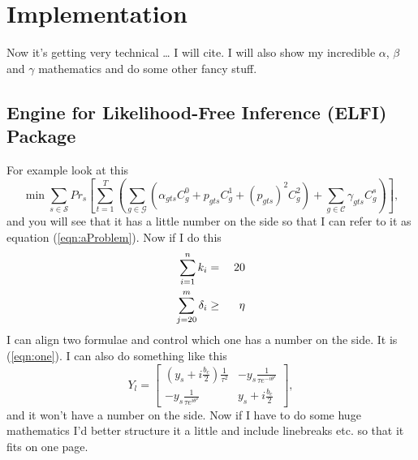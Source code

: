 \documentclass[11pt,twoside]{article}
\numberwithin{Theorem}{section}
\numberwithin{Definition}{section}
\numberwithin{Lemma}{section}
\numberwithin{Algorithm}{section}
\numberwithin{equation}{section}
\begin{document}
\section{Implementation}

Now it's getting very technical \ldots{} I will cite. I will also show my incredible $\alpha$, $\beta$ and $\gamma$ mathematics and do some other fancy stuff.

\subsection{Engine for Likelihood-Free Inference (ELFI) Package}

For example look at this
\begin{equation}\label{eqn:aProblem}
\min{}\sum_{s\in\mathcal{S}}Pr_{s}\left[\sum_{t=1}^{T}\left(
\sum_{g\in\mathcal{G}}\left(\alpha_{gts}C_{g}^{0}+
p_{gts}C_{g}^{1}+\left(p_{gts}\right)^{2}C_{g}^{2}\right)
+\sum_{g\in\mathcal{C}}\gamma_{gts}C_{g}^{s}\right)\right],
\end{equation}
and you will see that it has a little number on the side so that I can refer to it as equation (\ref{eqn:aProblem}). Now if I do this
\begin{eqnarray}
\sum_{i=1}^{n}k_{i}&=&20\label{eqn:one}\\
\sum_{j=20}^{m}\delta_{i}&\geq{}&\eta{}\notag
\end{eqnarray}
I can align two formulae and control which one has a number on the side. It is (\ref{eqn:one}). I can also do something like this
\begin{displaymath}
Y_{l}=\left[\begin{array}{cc}
             \left(y_{s}+i\frac{b_{c}}{2}\right)\frac{1}{\tau{}^{2}} &
             -y_{s}\frac{1}{\tau{}e^{-i\theta^{s}}}\\
             -y_{s}\frac{1}{\tau{}e^{i\theta^{s}}} &
             y_{s}+i\frac{b_{c}}{2}
             \end{array}\right],
\end{displaymath}
and it won't have a number on the side. Now if I have to do some huge mathematics I'd better structure it a little and include linebreaks etc. so that it fits on one page.
\end{document}
